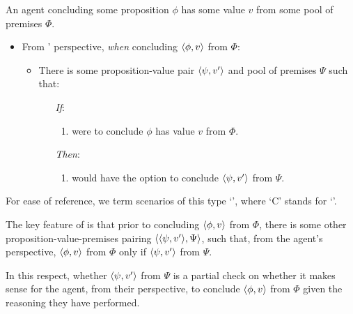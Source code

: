 \begin{note}
  \begin{scenarioType}
    \label{scenType:Coll}
    An agent \vAgent{} concluding some proposition \(\phi\) has some value \(v\) from some pool of premises \(\Phi\).

    \begin{itemize}
    \item
      From \vAgent{}' perspective, \emph{when} concluding \(\langle \phi, v \rangle\) from \(\Phi\):
      \begin{itemize}
      \item
        There is some proposition-value pair \(\langle \psi, v' \rangle\) and pool of premises \(\Psi\) such that:
        \begin{enumerate}
        \item[\emph{If}:]
          \begin{enumerate}[label=\alph*., ref=(\alph*)]
          \item
            \vAgent{} were to conclude \(\phi\) has value \(v\) from \(\Phi\).
          \end{enumerate}
          \item[\emph{Then}:]
            \begin{enumerate}[label=\alph*., ref=(\alph*), resume]
            \item
              \vAgent{} would have the option to conclude \(\langle \psi, v' \rangle\) from \(\Psi\).
            \end{enumerate}
        \end{enumerate}
      \end{itemize}
    \end{itemize}
    \vspace{-\baselineskip}
  \end{scenarioType}

  For ease of reference, we term scenarios of this type `', where `C' stands for `'.

  The key feature of  is that prior to concluding \(\langle \phi, v \rangle\) from \(\Phi\), there is some other proposition-value-premises pairing \(\langle \langle \psi, v' \rangle, \Psi \rangle\), such that, from the agent's perspective, \(\langle \phi, v \rangle\) from \(\Phi\) only if \(\langle \psi, v' \rangle\) from \(\Psi\).

  In this respect, whether \(\langle \psi, v' \rangle\) from \(\Psi\) is a partial check on whether it makes sense for the agent, from their perspective, to conclude \(\langle \phi, v \rangle\) from \(\Phi\) given the reasoning they have performed.
\end{note}


